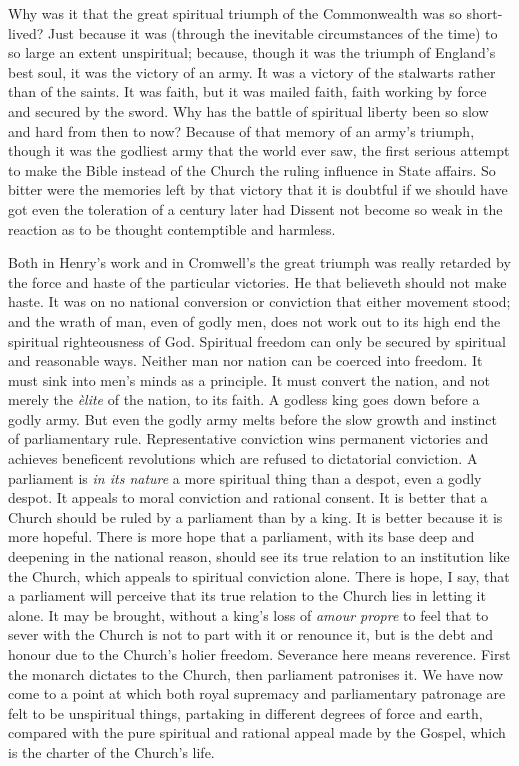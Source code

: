 \documentclass[12pt,a5paper,twoside]{book}
\begin{document}
Why was it that the great spiritual triumph of the 
Commonwealth was so short-lived? Just because it 
was (through the inevitable circumstances of the time) 
to so large an extent unspiritual; because, though it 
was the triumph of England's best soul, it was the 
victory of an army. It was a victory of the stalwarts 
rather than of the saints. It was faith, but it was 
mailed faith, faith working by force and secured by 
the sword. Why has the battle of spiritual liberty 
been so slow and hard from then to now? Because of 
that memory of an army's triumph, though it was the 
godliest army that the world ever saw, the first serious 
attempt to make the Bible instead of the Church the 
ruling influence in State affairs. So bitter were the 
memories left by that victory that it is doubtful if we 
should have got even the toleration of a century later 
had Dissent not become so weak in the reaction as 
to be thought contemptible and harmless. 

Both in Henry's work and in Cromwell's the great 
triumph was really retarded by the force and haste of 
the particular victories. He that believeth should not 
make haste. It was on no national conversion or 
conviction that either movement stood; and the 
wrath of man, even of godly men, does not work out 
to its high end the spiritual righteousness of God. 
Spiritual freedom can only be secured by spiritual and 
reasonable ways. Neither man nor nation can be 
coerced into freedom. It must sink into men's minds 
as a principle. It must convert the nation, and not 
merely the \textit{\`{e}lite} of the nation, to its faith. A godless 
king goes down before a godly army. But even the 
godly army melts before the slow growth and instinct 
of parliamentary rule. Representative conviction wins 
permanent victories and achieves beneficent revolutions 
which are refused to dictatorial conviction. A parliament 
is \textit{in its nature} a more spiritual thing than a 
despot, even a godly despot. It appeals to moral conviction 
and rational consent. It is better that a Church 
should be ruled by a parliament than by a king. It 
is better because it is more hopeful. There is more 
hope that a parliament, with its base deep and deepening 
in the national reason, should see its true relation 
to an institution like the Church, which appeals to 
spiritual conviction alone. There is hope, I say, that 
a parliament will perceive that its true relation to the 
Church lies in letting it alone. It may be brought, 
without a king's loss of \textit{amour propre} to feel that to 
sever with the Church is not to part with it or renounce 
it, but is the debt and honour due to the 
Church's holier freedom. Severance here means reverence. 
First the monarch dictates to the Church, then 
parliament patronises it. We have now come to a 
point at which both royal supremacy and parliamentary 
patronage are felt to be unspiritual things, partaking in 
different degrees of force and earth, compared with 
the pure spiritual and rational appeal made by the 
Gospel, which is the charter of the Church's life. 
\end{document}

